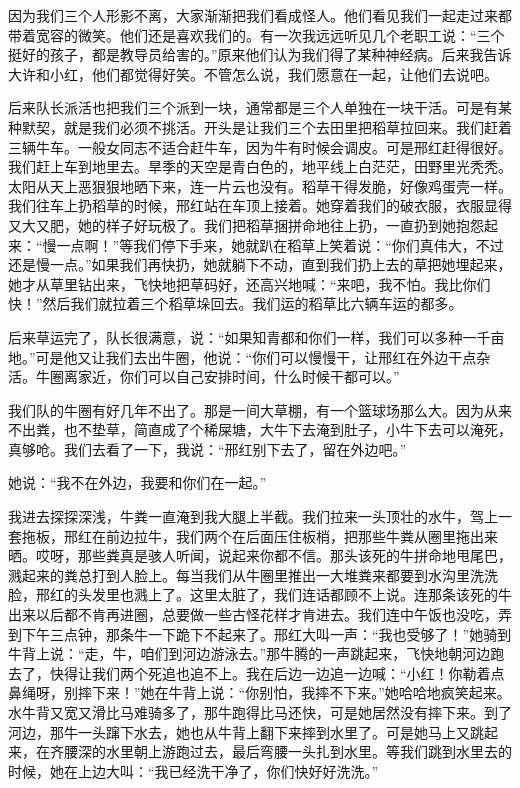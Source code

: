 因为我们三个人形影不离，大家渐渐把我们看成怪人。他们看见我们一起走过来都带着宽容的微笑。他们还是喜欢我们的。有一次我远远听见几个老职工说：“三个挺好的孩子，都是教导员给害的。”原来他们认为我们得了某种神经病。后来我告诉大许和小红，他们都觉得好笑。不管怎么说，我们愿意在一起，让他们去说吧。 

后来队长派活也把我们三个派到一块，通常都是三个人单独在一块干活。可是有某种默契，就是我们必须不挑活。开头是让我们三个去田里把稻草拉回来。我们赶着三辆牛车。一般女同志不适合赶牛车，因为牛有时候会调皮。可是邢红赶得很好。我们赶上车到地里去。旱季的天空是青白色的，地平线上白茫茫，田野里光秃秃。太阳从天上恶狠狠地晒下来，连一片云也没有。稻草干得发脆，好像鸡蛋壳一样。我们往车上扔稻草的时候，邢红站在车顶上接着。她穿着我们的破衣服，衣服显得又大又肥，她的样子好玩极了。我们把稻草捆拼命地往上扔，一直扔到她抱怨起来：“慢一点啊！”等我们停下手来，她就趴在稻草上笑着说：“你们真伟大，不过还是慢一点。”如果我们再快扔，她就躺下不动，直到我们扔上去的草把她埋起来，她才从草里钻出来，飞快地把草码好，还高兴地喊：“来吧，我不怕。我比你们快！”然后我们就拉着三个稻草垛回去。我们运的稻草比六辆车运的都多。 

后来草运完了，队长很满意，说：“如果知青都和你们一样，我们可以多种一千亩地。”可是他又让我们去出牛圈，他说：“你们可以慢慢干，让邢红在外边干点杂活。牛圈离家近，你们可以自己安排时间，什么时候干都可以。” 

我们队的牛圈有好几年不出了。那是一间大草棚，有一个篮球场那么大。因为从来不出粪，也不垫草，简直成了个稀屎塘，大牛下去淹到肚子，小牛下去可以淹死，真够呛。我们去看了一下，我说：“邢红别下去了，留在外边吧。” 

她说：“我不在外边，我要和你们在一起。” 

我进去探探深浅，牛粪一直淹到我大腿上半截。我们拉来一头顶壮的水牛，驾上一套拖板，邢红在前边拉牛，我们两个在后面压住板梢，把那些牛粪从圈里拖出来晒。哎呀，那些粪真是骇人听闻，说起来你都不信。那头该死的牛拼命地甩尾巴，溅起来的粪总打到人脸上。每当我们从牛圈里推出一大堆粪来都要到水沟里洗洗脸，邢红的头发里也溅上了。这里太脏了，我们连话都顾不上说。连那条该死的牛出来以后都不肯再进圈，总要做一些古怪花样才肯进去。我们连中午饭也没吃，弄到下午三点钟，那条牛一下跪下不起来了。邢红大叫一声：“我也受够了！”她骑到牛背上说：“走，牛，咱们到河边游泳去。”那牛腾的一声跳起来，飞快地朝河边跑去了，快得让我们两个死追也追不上。我在后边一边追一边喊：“小红！你勒着点鼻绳呀，别摔下来！”她在牛背上说：“你别怕，我摔不下来。”她哈哈地疯笑起来。水牛背又宽又滑比马难骑多了，那牛跑得比马还快，可是她居然没有摔下来。到了河边，那牛一头蹿下水去，她也从牛背上翻下来摔到水里了。可是她马上又跳起来，在齐腰深的水里朝上游跑过去，最后弯腰一头扎到水里。等我们跳到水里去的时候，她在上边大叫：“我已经洗干净了，你们快好好洗洗。” 

